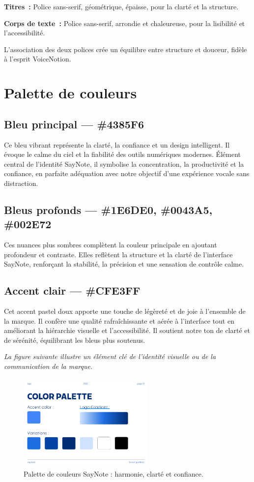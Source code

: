 \textbf{Titres~:}
Police sans-serif, géométrique, épaisse, pour la clarté et la structure.

\textbf{Corps de texte~:}
Police sans-serif, arrondie et chaleureuse, pour la lisibilité et l’accessibilité.

L’association des deux polices crée un équilibre entre structure et douceur, fidèle à l’esprit VoiceNotion.

\section{Palette de couleurs}
\subsection{Bleu principal — \#4385F6}
Ce bleu vibrant représente la clarté, la confiance et un design intelligent. Il évoque le calme du ciel et la fiabilité des outils numériques modernes. Élément central de l’identité SayNote, il symbolise la concentration, la productivité et la confiance, en parfaite adéquation avec notre objectif d’une expérience vocale sans distraction.

\subsection{Bleus profonds — \#1E6DE0, \#0043A5, \#002E72}
Ces nuances plus sombres complètent la couleur principale en ajoutant profondeur et contraste. Elles reflètent la structure et la clarté de l’interface SayNote, renforçant la stabilité, la précision et une sensation de contrôle calme.

\subsection{Accent clair — \#CFE3FF}
Cet accent pastel doux apporte une touche de légèreté et de joie à l’ensemble de la marque. Il confère une qualité rafraîchissante et aérée à l’interface tout en améliorant la hiérarchie visuelle et l’accessibilité. Il soutient notre ton de clarté et de sérénité, équilibrant les bleus plus soutenus.

\noindent
\textit{La figure suivante illustre un élément clé de l'identité visuelle ou de la communication de la marque.}
\begin{figure}[H]
    \centering
    \includegraphics[width=0.6\textwidth]{docs/visual-indentity/pictures/color-palette.png}
    \caption{Palette de couleurs SayNote : harmonie, clarté et confiance.}
\end{figure}

